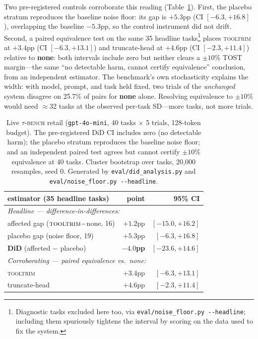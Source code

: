 \documentclass[11pt]{article}
\newcommand{\tooltrim}{\textsc{tooltrim}}
\begin{document}
Two pre-registered controls corroborate this reading (Table~\ref{tab:taubench}).
First, the placebo stratum reproduces the baseline noise floor: its gap is
$+5.3$pp (CI $[-6.3,+16.8]$), overlapping the baseline $-5.3$pp, so the control
instrument did not drift. Second, a paired equivalence test on the same 35
headline tasks\footnote{Diagnostic tasks excluded here too, via
\texttt{eval/noise\_floor.py -}\texttt{-headline}; including them spuriously
tightens the interval by scoring on the data used to fix the system.} places
\tooltrim{} at $+3.4$pp (CI $[-6.3,+13.1]$) and truncate-head at $+4.6$pp
(CI $[-2.3,+11.4]$) relative to \textbf{none}: both intervals include zero but
neither clears a $\pm10$\% TOST margin---the same ``no detectable harm, cannot
certify equivalence'' conclusion, from an independent estimator. The benchmark's
own stochasticity explains the width: with model, prompt, and task held fixed, two
trials of the \emph{unchanged} system disagree on 25.7\% of pairs for \textbf{none}
alone. Resolving equivalence to $\pm10$\% would need $\approx$32 tasks at the
observed per-task SD---more tasks, not more trials.

\begin{table}[t]
\centering
\begin{tabular}{lrr}
\toprule
estimator (35 headline tasks) & point & 95\% CI \\
\midrule
\multicolumn{3}{l}{\emph{Headline --- difference-in-differences:}} \\
\quad affected gap ($\tooltrim-$none, 16) & $+1.2$pp & $[-15.0,+16.2]$ \\
\quad placebo gap (noise floor, 19)       & $+5.3$pp & $[-6.3,+16.8]$ \\
\quad \textbf{DiD} (affected $-$ placebo) & $\mathbf{-4.0}$\textbf{pp} & $\mathbf{[-23.6,+14.6]}$ \\
\midrule
\multicolumn{3}{l}{\emph{Corroborating --- paired equivalence vs.\ none:}} \\
\quad \tooltrim{}      & $+3.4$pp & $[-6.3,+13.1]$ \\
\quad truncate-head    & $+4.6$pp & $[-2.3,+11.4]$ \\
\bottomrule
\end{tabular}
\caption{Live \textsc{$\tau$-bench} retail (\texttt{gpt-4o-mini}, 40 tasks
$\times$ 5 trials, 128-token budget). The pre-registered DiD CI includes zero
(no detectable harm); the placebo stratum reproduces the baseline noise floor; and
an independent paired test agrees but cannot certify $\pm10$\% equivalence at 40
tasks. Cluster bootstrap over tasks, 20{,}000 resamples, seed 0. Generated by
\texttt{eval/did\_analysis.py} and \texttt{eval/noise\_floor.py -}\texttt{-headline}.}
\label{tab:taubench}
\end{table}
\end{document}
